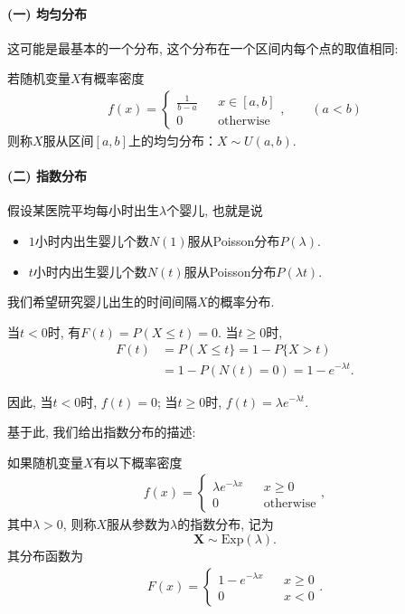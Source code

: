 \paragraph{(一) 均匀分布}

这可能是最基本的一个分布, 这个分布在一个区间内每个点的取值相同:

\begin{definition}
    若随机变量$X$有概率密度
    \begin{align*}
        f(x)=\left\{\begin{array}{lcl}
                        \frac1{b-a} &  & x\in [a,b]       \\
                        0           &  & \mbox{otherwise}
                    \end{array}\right. ,\qquad (a<b)
    \end{align*}
    则称$X$服从区间$[a,b]$上的均匀分布：$X\sim U(a,b)$.
\end{definition}%


\paragraph{(二) 指数分布}

假设某医院平均每小时出生$\lambda$个婴儿, 也就是说
\begin{itemize}
    \item $1$小时内出生婴儿个数$N(1)$服从Poisson分布$P(\lambda)$. 
    \item $t$小时内出生婴儿个数$N(t)$服从Poisson分布$P(\lambda t)$. 
\end{itemize}
我们希望研究婴儿出生的时间间隔$X$的概率分布. 


当$t<0$时, 有$F(t)=P(X\le t)=0$.  当$t\ge0$时, 
\begin{align*}
    F(t) & =P(X\le t\}=1-P\{X>t)          \\
         & =1-P(N(t)=0)=1-e^{-\lambda t}.
\end{align*}

因此, 当$t<0$时, $f(t)=0$;  当$t\ge0$时, $f(t)=\lambda e^{-\lambda t}$. 

基于此, 我们给出指数分布的描述:
\begin{definition}
    如果随机变量$X$有以下概率密度
    \begin{align*}
        f(x)=\left\{\begin{array}{lcl}
                        \lambda e^{-\lambda x} &  & x\ge 0           \\
                        0                      &  & \mbox{otherwise}
                    \end{array}\right. ,
    \end{align*}
    其中$\lambda>0$, 则称$X$服从参数为$\lambda$的指数分布, 记为
    \[\pmb X\sim \text{Exp}(\lambda). \]
    其分布函数为
    \begin{align*}
        F(x)=\left\{\begin{array}{lcl}
                        1- e^{-\lambda x} &  & x\ge 0 \\
                        0                 &  & x<0
                    \end{array}\right. .
    \end{align*}
\end{definition}

